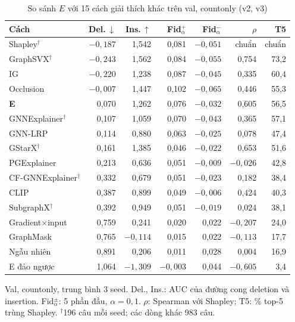 \begin{table}[t]
  \caption{So sánh $E$ với 15 cách giải thích khác trên val, countonly (v2, v3)}
  \label{tab:xai-explainers}
  \centering
  \footnotesize
  \setlength{\tabcolsep}{3pt}
  \begin{tabular}{@{}lrrrrrr@{}}
    \toprule
    Cách & Del.\,$\downarrow$ & Ins.\,$\uparrow$ & Fid$_{\alpha}^{+}$ & Fid$_{\alpha}^{-}$ & $\rho$ & T5 \\
    \midrule
    Shapley$^{\dagger}$ & $-0{,}187$ & 1,542 & 0,081 & $-0{,}051$ & chuẩn & chuẩn \\
    GraphSVX$^{\dagger}$ & $-0{,}243$ & 1,562 & 0,084 & $-0{,}055$ & 0,754 & 73,2 \\
    IG & $-0{,}220$ & 1,238 & 0,087 & $-0{,}045$ & 0,335 & 60,4 \\
    Occlusion & $-0{,}007$ & 1,447 & 0,102 & $-0{,}065$ & 0,446 & 55,3 \\
    \textbf{E} & 0,070 & 1,262 & 0,076 & $-0{,}032$ & 0,605 & 56,5 \\
    GNNExplainer$^{\dagger}$ & 0,107 & 1,059 & 0,070 & $-0{,}043$ & 0,365 & 57,1 \\
    GNN-LRP & 0,114 & 0,880 & 0,063 & $-0{,}025$ & 0,078 & 47,4 \\
    GStarX$^{\dagger}$ & 0,161 & 1,385 & 0,046 & $-0{,}022$ & 0,653 & 51,6 \\
    PGExplainer & 0,213 & 0,636 & 0,051 & $-0{,}009$ & $-0{,}026$ & 42,8 \\
    CF-GNNExplainer$^{\dagger}$ & 0,332 & 0,679 & 0,051 & $-0{,}023$ & 0,182 & 38,4 \\
    CLIP & 0,387 & 0,899 & 0,049 & $-0{,}006$ & 0,424 & 40,3 \\
    SubgraphX$^{\dagger}$ & 0,392 & 0,949 & 0,051 & $-0{,}019$ & 0,024 & 38,1 \\
    Gradient$\times$input & 0,759 & 0,241 & 0,020 & 0,022 & $-0{,}207$ & 24,0 \\
    GraphMask & 0,765 & $-0{,}114$ & 0,015 & 0,022 & $-0{,}113$ & 17,7 \\
    Ngẫu nhiên & 0,891 & 0,206 & 0,011 & 0,028 & 0,004 & 16,9 \\
    E đảo ngược & 1,064 & $-1{,}309$ & $-0{,}003$ & 0,044 & $-0{,}605$ & 3,4 \\
    \bottomrule
  \end{tabular}
  \par\smallskip
  {\scriptsize\raggedright
    Val, countonly, trung bình 3 seed. Del., Ins.: AUC của đường cong deletion và insertion.
    Fid$_{\alpha}^{\pm}$: 5 phần đầu, $\alpha=0{,}1$. $\rho$: Spearman với Shapley; T5: \% top-5 trùng Shapley.
    $^{\dagger}$196 câu mỗi seed; các dòng khác 983 câu.\par}
\end{table}


